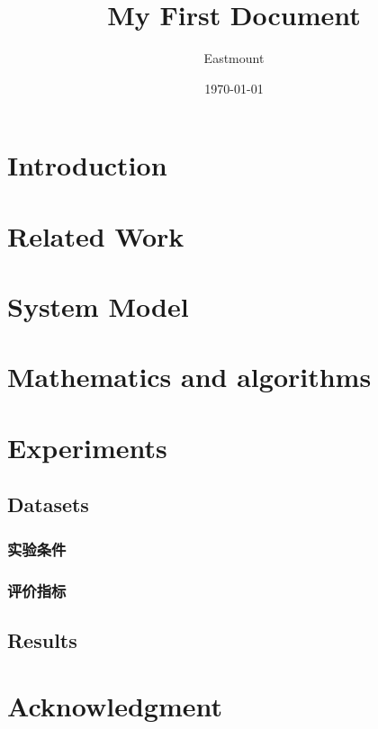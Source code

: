 \documentclass{article}
\title{My First Document}
\author{Eastmount}
\date{\today}
\begin{document}
	\maketitle
	
	\section{Introduction}
	\section{Related Work}
	\section{System Model}
	\section{Mathematics and algorithms}
	\section{Experiments}
	\subsection{Datasets}
	\subsubsection{实验条件}
	\subsubsection{评价指标}
	\subsection{Results}
	\section{Acknowledgment}
	
\end{document}
